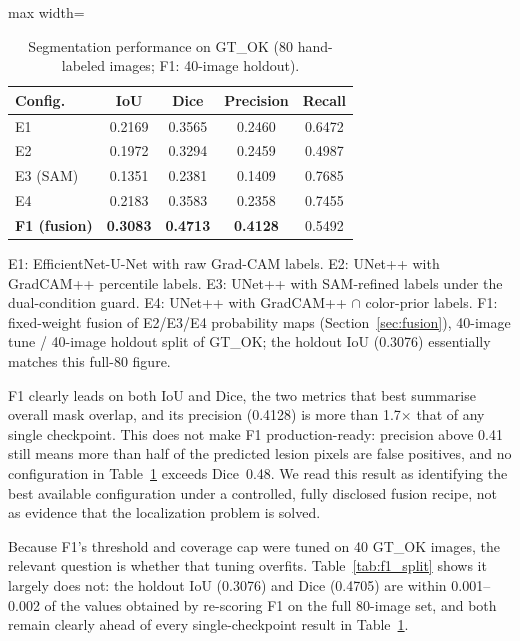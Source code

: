 \documentclass[final,5p,times,twocolumn,authoryear]{elsarticle}
\begin{document}
\begin{table}[!htbp]
\centering
\caption{Segmentation performance on GT\_OK (80 hand-labeled images; F1: 40-image holdout).}
\label{tab:segmentation}
\footnotesize
\begin{adjustbox}{max width=\columnwidth}
\begin{tabular}{lcccc}
\toprule
\textbf{Config.} & \textbf{IoU} & \textbf{Dice} & \textbf{Precision} & \textbf{Recall} \\
\midrule
E1        & 0.2169 & 0.3565 & 0.2460 & 0.6472 \\
E2        & 0.1972 & 0.3294 & 0.2459 & 0.4987 \\
E3 (SAM)  & 0.1351 & 0.2381 & 0.1409 & 0.7685 \\
E4        & 0.2183 & 0.3583 & 0.2358 & 0.7455 \\
\textbf{F1 (fusion)} & \textbf{0.3083} & \textbf{0.4713} & \textbf{0.4128} & 0.5492 \\
\bottomrule
\end{tabular}
\end{adjustbox}
\par\smallskip
\raggedright\scriptsize E1: EfficientNet-U-Net with raw Grad-CAM labels. E2: UNet++ with GradCAM++ percentile labels. E3: UNet++ with SAM-refined labels under the dual-condition guard. E4: UNet++ with GradCAM++ $\cap$ color-prior labels. F1: fixed-weight fusion of E2/E3/E4 probability maps (Section~\ref{sec:fusion}), 40-image tune / 40-image holdout split of GT\_OK; the holdout IoU (0.3076) essentially matches this full-80 figure.
\end{table}

F1 clearly leads on both IoU and Dice, the two metrics that best summarise overall mask overlap, and its precision (0.4128) is more than 1.7$\times$ that of any single checkpoint. This does not make F1 production-ready: precision above 0.41 still means more than half of the predicted lesion pixels are false positives, and no configuration in Table~\ref{tab:segmentation} exceeds Dice~0.48. We read this result as identifying the best available configuration under a controlled, fully disclosed fusion recipe, not as evidence that the localization problem is solved.

Because F1's threshold and coverage cap were tuned on 40 GT\_OK images, the relevant question is whether that tuning overfits. Table~\ref{tab:f1_split} shows it largely does not: the holdout IoU (0.3076) and Dice (0.4705) are within 0.001--0.002 of the values obtained by re-scoring F1 on the full 80-image set, and both remain clearly ahead of every single-checkpoint result in Table~\ref{tab:segmentation}.
\end{document}
